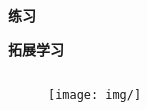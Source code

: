 

\begin{mdframed}[hidealllines=true,backgroundcolor=gray!20]
\textbf{练习 }
\end{mdframed}


\begin{mdframed}[hidealllines=true,backgroundcolor=gray!20]
\textbf{拓展学习 }
\end{mdframed}


\begin{lstlisting}
\end{lstlisting}

\begin{figure}[htb]
    \centering
    \texttt{[image: img/]}
    \caption{}
    \label{fig:}
\end{figure}